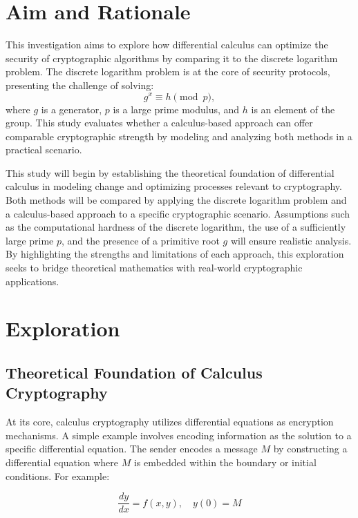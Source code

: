 \documentclass[12pt]{article}
\begin{document}
\section*{Aim and Rationale}

This investigation aims to explore how differential calculus can optimize the security of cryptographic algorithms by comparing it to the discrete logarithm problem. The discrete logarithm problem is at the core of security protocols, presenting the challenge of solving:
\[
g^x \equiv h \pmod{p},
\]
where \( g \) is a generator, \( p \) is a large prime modulus, and \( h \) is an element of the group. This study evaluates whether a calculus-based approach can offer comparable cryptographic strength by modeling and analyzing both methods in a practical scenario.

This study will begin by establishing the theoretical foundation of differential calculus in modeling change and optimizing processes relevant to cryptography. Both methods will be compared by applying the discrete logarithm problem and a calculus-based approach to a specific cryptographic scenario. Assumptions such as the computational hardness of the discrete logarithm, the use of a sufficiently large prime \( p \), and the presence of a primitive root \( g \) will ensure realistic analysis. By highlighting the strengths and limitations of each approach, this exploration seeks to bridge theoretical mathematics with real-world cryptographic applications.





\section{Exploration}

\subsection*{Theoretical Foundation of Calculus Cryptography}

At its core, calculus cryptography utilizes differential equations as encryption mechanisms. A simple example involves encoding information as the solution to a specific differential equation. The sender encodes a message \( M \) by constructing a differential equation where \( M \) is embedded within the boundary or initial conditions. For example:

\[
\frac{dy}{dx} = f(x, y), \quad y(0) = M
\]
\end{document}
